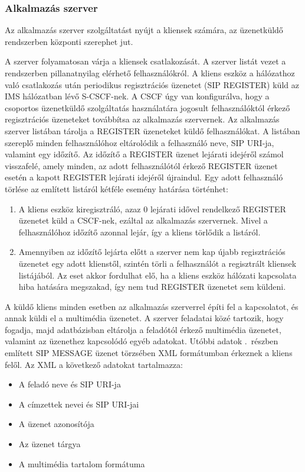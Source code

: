 \subsubsection{Alkalmazás szerver}
\label{sec:appserver}

Az alkalmazás szerver szolgáltatást nyújt a kliensek számára, az üzenetküldő rendszerben központi szerephet jut.

A szerver folyamatosan várja a kliensek csatlakozását. A szerver listát vezet a rendszerben pillanatnyilag elérhető felhasználókról. A kliens eszköz a hálózathoz való csatlakozás után periodikus regisztrációs üzenetet (SIP REGISTER) küld az IMS hálózatban lévő S-CSCF-nek. A CSCF úgy van konfigurálva, hogy a csoportos üzenetküldő szolgáltatás használatára jogosult felhasználóktól érkező regisztrációs üzeneteket továbbítsa az alkalmazás szervernek. Az alkalmazás szerver listában tárolja a REGISTER üzeneteket küldő felhasználókat. A listában szereplő minden felhasználóhoz eltárolódik a felhasználó neve, SIP URI-ja, valamint egy időzítő. Az időzítő a REGISTER üzenet lejárati idejéről számol visszafelé, amely minden, az adott felhasználótól érkező REGISTER üzenet esetén a kapott REGISTER lejárati idejéről újraindul. Egy adott felhasználó törlése az említett listáról kétféle esemény határása történhet:
\begin{enumerate}\itemsep1pt
\item	A kliens eszköz kiregisztráló, azaz 0 lejárati idővel rendelkező REGISTER üzenetet küld a CSCF-nek, ezáltal az alkalmazás szervernek. Mivel a felhasználóhoz időzítő azonnal lejár, így a kliens törlődik a listáról. 
\item Amennyiben az időzítő lejárta előtt a szerver nem kap újabb regisztrációs üzenetet egy adott klienstől, szintén törli a felhasználót a regisztrált kliensek listájából. Az eset akkor fordulhat elő, ha a kliens eszköz hálózati kapcsolata hiba hatására megszakad, így nem tud REGISTER üzenetet sem küldeni.
\end{enumerate} 

A küldő kliens minden esetben az alkalmazás szerverrel építi fel a kapcsolatot, és annak küldi el a multimédia üzenetet. A szerver feladatai közé tartozik, hogy fogadja, majd adatbázisban eltárolja a feladótól érkező multimédia üzenetet, valamint az üzenethez kapcsolódó egyéb adatokat. Utóbbi adatok .~részben említett SIP MESSAGE üzenet törzsében XML formátumban érkeznek a kliens felől. Az XML a következő adatokat tartalmazza: 

\begin{itemize}\itemsep1pt
\item	A feladó neve és SIP URI-ja
\item A címzettek nevei és SIP URI-jai
\item A üzenet azonosítója
\item Az üzenet tárgya
\item A multimédia tartalom formátuma
\end{itemize}

